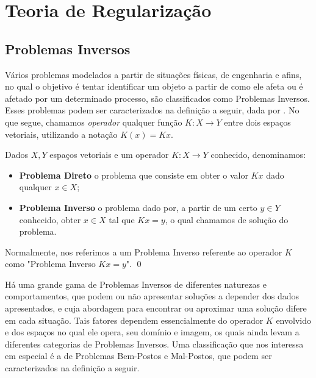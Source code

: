 \chapter{Teoria de Regularização} 
\label{cap:teoria-regularizacao}
\section{Problemas Inversos}

Vários problemas modelados a partir de situações físicas, de engenharia e afins, no qual o objetivo é tentar identificar um objeto a partir de como ele afeta ou é afetado por um determinado processo, são classificados como Problemas Inversos. Esses problemas podem ser caracterizados na definição a seguir, dada por \cite{kirsch}. No que segue, chamamos \textit{operador} qualquer função $K:X \to Y$ entre dois espaços vetoriais, utilizando a notação $K(x) = Kx$.

\begin{defin}
Dados $X,Y$ espaços vetoriais e um operador $K: X \to Y$ conhecido, denominamos: 
\begin{itemize}
    \item \textbf{Problema Direto} o problema  que consiste em obter o valor $Kx$ dado qualquer $x \in X$;
    \item \textbf{Problema Inverso} o problema dado por, a partir de um certo $y\in Y$ conhecido, obter $x \in X$ tal que $Kx = y$, o qual chamamos de solução do problema.
\end{itemize}

Normalmente, nos referimos a um Problema Inverso referente ao operador $K$ como "Problema Inverso $Kx=y$". \qed
\end{defin}
	
Há uma grande gama de Problemas Inversos de diferentes naturezas e comportamentos, que podem ou não apresentar soluções a depender dos dados apresentados, e cuja abordagem para encontrar ou aproximar uma solução difere em cada situação. Tais fatores dependem essencialmente do operador $K$ envolvido e dos espaços no qual ele opera, seu domínio e imagem, os quais ainda levam a diferentes categorias de Problemas Inversos. Uma classificação que nos interessa em especial é a de Problemas Bem-Postos e Mal-Postos, que podem ser caracterizados na definição a seguir.  

